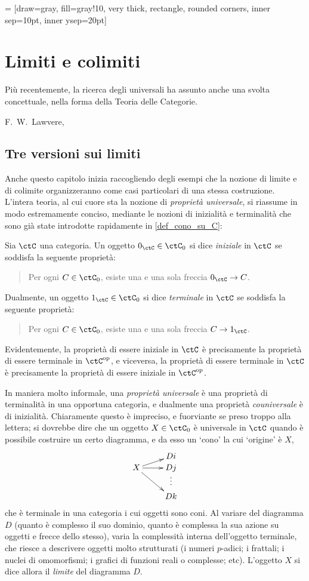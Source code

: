  = [draw=gray, fill=gray!10, very thick,
rectangle, rounded corners, inner sep=10pt, inner ysep=20pt]
\chapter{Limiti e colimiti}\label{chap_limiti_colimiti}
\epigraph{Più recentemente, la ricerca degli universali ha assunto anche una svolta concettuale, nella forma della Teoria delle Categorie.}{F.\ W.\ Lawvere, \cite{lawvere1969adjointness}}
\section{Tre versioni sui limiti}
Anche questo capitolo inizia raccogliendo degli esempi che la nozione di limite e di colimite organizzeranno come casi particolari di una stessa costruzione. L'intera teoria, al cui cuore sta la nozione di \emph{proprietà universale}, si riassume in modo estremamente conciso, mediante le nozioni di inizialità e terminalità che sono già state introdotte rapidamente in \ref{def_cono_su_C}:
\begin{definition}
	Sia \(\ctC\) una categoria. Un oggetto \(\init_\ctC\in\ctC_0\) si dice \emph{iniziale} in \(\ctC\) se soddisfa la seguente proprietà:
	\begin{quote}
		Per ogni \(C\in\ctC_0\), esiste una e una sola freccia \(\init_\ctC \to C\).
	\end{quote}
	Dualmente, un oggetto \(\term_\ctC\in\ctC_0\) si dice \emph{terminale} in \(\ctC\) se soddisfa la seguente proprietà:
	\begin{quote}
		Per ogni \(C\in\ctC_0\), esiste una e una sola freccia \(C\to\term_\ctC\).
	\end{quote}
\end{definition}
Evidentemente, la proprietà di essere iniziale in \(\ctC\) è precisamente la proprietà di essere terminale in \(\ctC^\op\), e viceversa, la proprietà di essere terminale in \(\ctC\) è precisamente la proprietà di essere iniziale in \(\ctC^\op\).

In maniera molto informale, una \emph{proprietà universale} è una proprietà di terminalità in una opportuna categoria, e dualmente una proprietà \emph{couniversale} è di inizialità. Chiaramente questo è impreciso, e fuorviante se preso troppo alla lettera; si dovrebbe dire che un oggetto \(X\in\ctC_0\) è universale in \(\ctC\) quando è possibile costruire un certo diagramma, e da esso un `cono' la cui `origine' è \(X\),
\[\xymatrix@R=0mm{
	& Di \\
	X \ar@{->}[ru] \ar@{->}[r] \ar@{->}[rdd] & Dj \\
	& \vdots \\
	& Dk
	}\]
che è terminale in una categoria i cui oggetti sono coni. Al variare del diagramma \(D\) (quanto è complesso il suo dominio, quanto è complessa la sua azione su oggetti e frecce dello stesso), varia la complessità interna dell'oggetto terminale, che riesce a descrivere oggetti molto strutturati (i numeri \(p\)-adici; i frattali; i nuclei di omomorfismi; i grafici di funzioni reali o complesse; etc). L'oggetto \(X\) si dice allora il \emph{limite} del diagramma \(D\).

